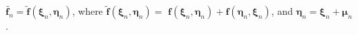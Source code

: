 \documentclass[oneside,onecolumn,10pt,final]{asme2ej}
\begin{document}
$\tilde{\bm{f}_n}=\tilde{\bm{f}}(\bm{\xi}_n,\bm{\eta}_n)$, 
where $\tilde{\bm{f}}(\bm{\xi}_n,\bm{\eta}_n)=$%
$\bm{f}(\bm{\xi}_n,\bm{\eta}_n)+\bm{f}(\bm{\eta}_n,\bm{\xi}_n)$,
and $\bm {\eta}_n = \bm {\xi}_n + \bm {\mu}_n $.
%
\end{document}
